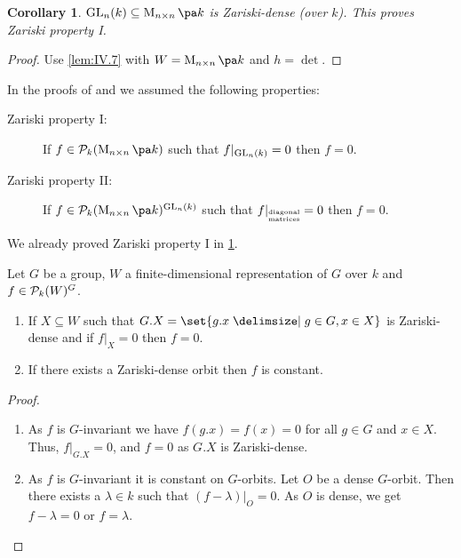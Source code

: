 \documentclass[12pt,a4paper]{scrartcl}
\theoremstyle{cplain}
\newtheorem{cor}[thmcounter]{Corollary}
\theoremstyle{cplain}
\theoremstyle{cplain}
\theoremstyle{definition}
\begin{document}
\begin{otherlanguage}{english}
\begin{cor} \label{cor:IV.8}
  $\GL_n(k) \subseteq \Mat nk$ is Zariski-dense (over $k$). This proves Zariski property I.
\end{cor}
\begin{proof}
  Use \cref{lem:IV.7} with $W = \Mat nk$ and $h= \det$.
\end{proof}


In the proofs of  and  we assumed the following properties:
\begin{description}
  \item[Zariski property I:] If $f\in\Ps_k(\Mat nk)$ such that $f|_{\operatorname{GL}_n(k)} = 0$ then $f=0$.
  \item[Zariski property II:] If $f\in\Ps_k(\Mat nk)^{\GL_n(k)}$ such that $f|_{\substack{\text{\tiny diagonal}\\\text{\tiny matrices}}} = 0$ then $f=0$.
\end{description}

We already proved Zariski property I in \cref{cor:IV.8}.

\begin{lem} \label{lem:IV.9}
  Let $G$ be a group, $W$ a finite-dimensional representation of $G$ over $k$ and $f\in\mathcal{P}_k(W)^G$.
  \begin{enumerate}
    \item If $X\subseteq W$ such that $G.X = \set{g.x \given g\in G,x \in X}$ is Zariski-dense and if $f|_X = 0$ then $f=0$. \label{lem:IV.9:1}
    \item If there exists a Zariski-dense orbit then $f$ is constant. \label{lem:IV.9:2} %
  \end{enumerate}
\end{lem}
\begin{proof}
  \leavevmode
  \begin{enumerate}[label=\ref{lem:IV.9:\arabic*}]
    \item As $f$ is $G$-invariant we have $f(g.x) = f(x) = 0$ for all $g\in G$ and $x\in X$. Thus, $f|_{G.X} = 0$, and $f=0$ as $G.X$ is Zariski-dense.
    \item As $f$ is $G$-invariant it is constant on $G$-orbits. Let $O$ be a dense $G$-orbit. Then there exists a $\lambda\in k$ such that $(f-\lambda)|_O = 0$. As $O$ is dense, we get $f-\lambda = 0$ or $f=\lambda$.
    \qedhere
  \end{enumerate}
\end{proof}


\end{otherlanguage}
\end{document}
